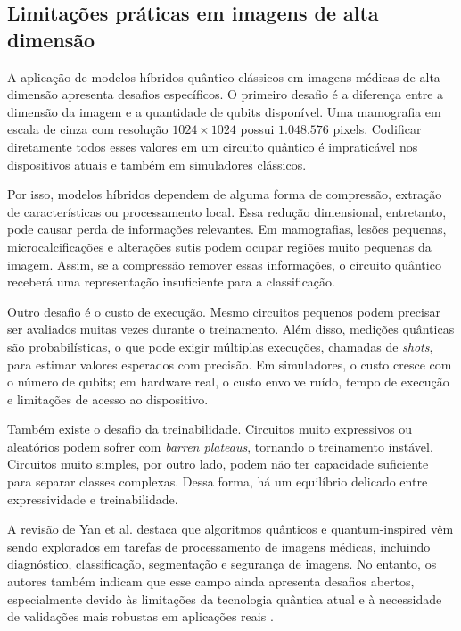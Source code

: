 \documentclass[
    12pt,
    openright,
    oneside,
    a4paper,
    english,
    brazil
]{abntex2}
\begin{document}
\subsection{Limitações práticas em imagens de alta dimensão}

A aplicação de modelos híbridos quântico-clássicos em imagens médicas de alta dimensão apresenta desafios específicos. O primeiro desafio é a diferença entre a dimensão da imagem e a quantidade de qubits disponível. Uma mamografia em escala de cinza com resolução \(1024 \times 1024\) possui \(1.048.576\) pixels. Codificar diretamente todos esses valores em um circuito quântico é impraticável nos dispositivos atuais e também em simuladores clássicos.

Por isso, modelos híbridos dependem de alguma forma de compressão, extração de características ou processamento local. Essa redução dimensional, entretanto, pode causar perda de informações relevantes. Em mamografias, lesões pequenas, microcalcificações e alterações sutis podem ocupar regiões muito pequenas da imagem. Assim, se a compressão remover essas informações, o circuito quântico receberá uma representação insuficiente para a classificação.

Outro desafio é o custo de execução. Mesmo circuitos pequenos podem precisar ser avaliados muitas vezes durante o treinamento. Além disso, medições quânticas são probabilísticas, o que pode exigir múltiplas execuções, chamadas de \textit{shots}, para estimar valores esperados com precisão. Em simuladores, o custo cresce com o número de qubits; em hardware real, o custo envolve ruído, tempo de execução e limitações de acesso ao dispositivo.

Também existe o desafio da treinabilidade. Circuitos muito expressivos ou aleatórios podem sofrer com \textit{barren plateaus}, tornando o treinamento instável. Circuitos muito simples, por outro lado, podem não ter capacidade suficiente para separar classes complexas. Dessa forma, há um equilíbrio delicado entre expressividade e treinabilidade.

A revisão de Yan et al. destaca que algoritmos quânticos e quantum-inspired vêm sendo explorados em tarefas de processamento de imagens médicas, incluindo diagnóstico, classificação, segmentação e segurança de imagens. No entanto, os autores também indicam que esse campo ainda apresenta desafios abertos, especialmente devido às limitações da tecnologia quântica atual e à necessidade de validações mais robustas em aplicações reais \cite{yan2024quantumMedicalImageReview}.
\end{document}
